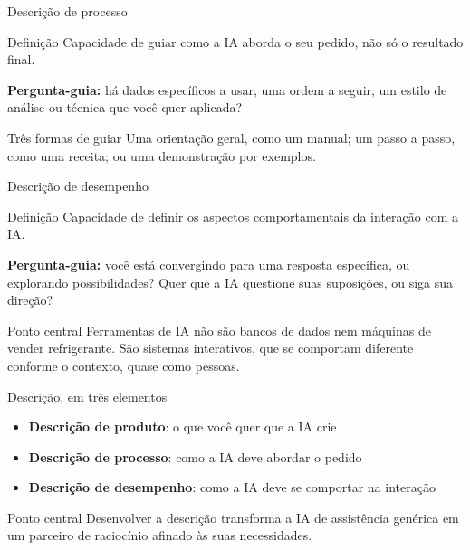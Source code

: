 \documentclass[aspectratio=169,11pt]{beamer}
\begin{document}
\begin{frame}{Descrição de processo}
  \begin{notebox}{Definição}
    \small Capacidade de guiar como a IA aborda o seu pedido, não só o resultado final.
  \end{notebox}
  \vspace{0.25cm}
  \textbf{Pergunta-guia:} há dados específicos a usar, uma ordem a seguir, um estilo de análise ou técnica que você quer aplicada?

  \begin{alertbox}{Três formas de guiar}
    \small Uma orientação geral, como um manual; um passo a passo, como uma receita; ou uma demonstração por exemplos.
  \end{alertbox}
\end{frame}

\begin{frame}{Descrição de desempenho}
  \begin{notebox}{Definição}
    \small Capacidade de definir os aspectos comportamentais da interação com a IA.
  \end{notebox}
  \vspace{0.25cm}
  \textbf{Pergunta-guia:} você está convergindo para uma resposta específica, ou explorando possibilidades? Quer que a IA questione suas suposições, ou siga sua direção?

  \begin{alertbox}{Ponto central}
    \small Ferramentas de IA não são bancos de dados nem máquinas de vender refrigerante. São sistemas interativos, que se comportam diferente conforme o contexto, quase como pessoas.
  \end{alertbox}
\end{frame}

\begin{frame}{Descrição, em três elementos}
  \begin{itemize}
    \item \textbf{Descrição de produto}: o que você quer que a IA crie
    \item \textbf{Descrição de processo}: como a IA deve abordar o pedido
    \item \textbf{Descrição de desempenho}: como a IA deve se comportar na interação
  \end{itemize}
  \vspace{0.3cm}
  \begin{alertbox}{Ponto central}
    \small Desenvolver a descrição transforma a IA de assistência genérica em um parceiro de raciocínio afinado às suas necessidades.
  \end{alertbox}
\end{frame}
\end{document}
